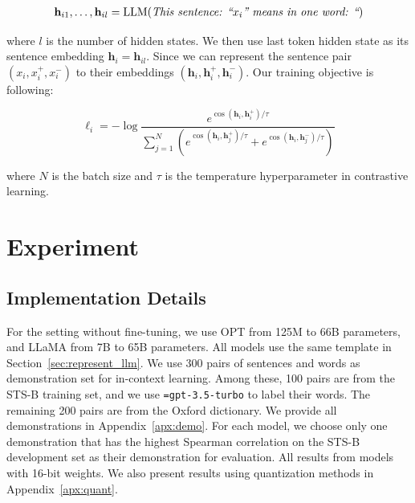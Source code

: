 \documentclass{article}
\newcommand{\hytt}[1]{\texttt{\hyphenchar \font=\defaulthyphenchar#1}}
\begin{document}
\begin{equation}
\begin{split}
  \mathbf{h}_{i1}, \ldots, \mathbf{h}_{il} = {\rm LLM}(\textit{This  sen}&\textit{tence: ``} x_i \textit{'' means in one word: ``})\\
\end{split}
\end{equation}

where $l$ is the number of hidden states. We then use last token hidden state as its sentence embedding $\mathbf{h}_{i} = \mathbf{h}_{il}$.
Since we can represent the sentence pair $(x_i, x_i^{+}, x_i^{-})$ to their embeddings $(\mathbf{h}_i, \mathbf{h}_i^{+}, \mathbf{h}_i^{-})$.
Our training objective is following:

\begin{equation}
\ell_{i}=-\log \frac{e^{\operatorname{cos}\left(\mathbf{h}_i, \mathbf{h}_i^{+}\right) / \tau}}{\sum_{j=1}^N\left(e^{\operatorname{cos}\left(\mathbf{h}_i, \mathbf{h}_j^{+}\right) / \tau}+e^{\operatorname{cos}\left(\mathbf{h}_i, \mathbf{h}_j^{-}\right) / \tau}\right)}
\end{equation}

where $N$ is the batch size and \(\tau\) is the temperature hyperparameter in contrastive learning.

\section{Experiment}
\subsection{Implementation Details}
For the setting without fine-tuning, we use OPT from 125M to 66B parameters, and LLaMA from 7B to 65B parameters.
All models use the same template in Section~\ref{sec:represent_llm}.
 We use 300 pairs of sentences and words as demonstration set for in-context learning. %
 Among these, 100 pairs are from the STS-B training set, and we use \hytt{gpt-3.5-turbo} to label their words. The remaining 200 pairs are from the Oxford dictionary. We provide all demonstrations in Appendix~\ref{apx:demo}.
For each model, we choose only one demonstration that has the highest Spearman correlation on the STS-B development set as their demonstration for evaluation.
All results from models with 16-bit weights. We also present results using quantization methods in Appendix~\ref{apx:quant}.
\end{document}
